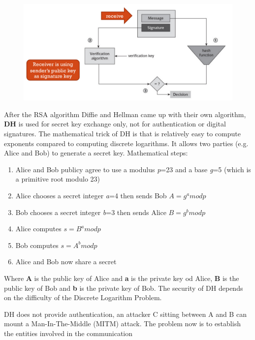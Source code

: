     \FloatBarrier
    
    \begin{figure}[h!]
        \centering
        \includegraphics[scale=0.3]{images/intrsa2.png}
    \end{figure}
    
    \FloatBarrier
    
    After the RSA algorithm Diffie and Hellman came up with their own algorithm, \textbf{DH} is used for secret key exchange only, not for authentication or digital signatures. The mathematical trick of DH is that is relatively easy to compute exponents compared to computing discrete logarithms. It allows two parties (e.g. Alice and Bob) to generate a secret key. Mathematical steps:
    \begin{enumerate}
        \item Alice and Bob publicy agree to use a modulus \textit{p}=23 and a base \textit{g}=5 (which is a primitive root modulo 23)
        \item Alice chooses a secret integer \textit{a}=4 then sends Bob $A=g^a mod p$
        \item Bob chooses a secret integer \textit{b}=3 then sends Alice $B=g^b mod p$
        \item Alice computes $s=B^a mod p$
        \item Bob computes $s=A^b mod p$
        \item Alice and Bob now share a secret
    \end{enumerate}
    Where \textbf{A} is the public key of Alice and \textbf{a} is the private key od Alice, \textbf{B} is the public key of Bob and \textbf{b} is the private key of Bob. The security of DH depends on the difficulty of the Discrete Logarithm Problem.
    
    DH does not provide authentication, an attacker C sitting between A and B can mount a Man-In-The-Middle (MITM) attack. The problem now is to establish the entities involved in the communication